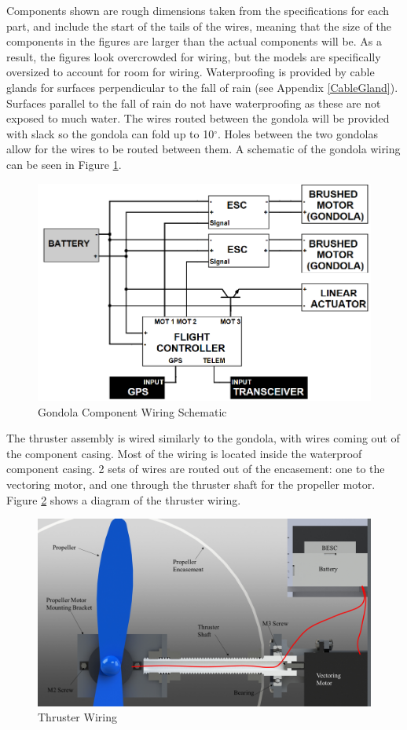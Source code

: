 \documentclass[../main.tex]{subfiles}
\begin{document}
Components shown are rough dimensions taken from the specifications for each part, and include the start of the tails of the wires, meaning that the size of the components in the figures are larger than the actual components will be. As a result, the figures look overcrowded for wiring, but the models are specifically oversized to account for room for wiring. Waterproofing is provided by cable glands for surfaces perpendicular to the fall of rain (see Appendix \ref{CableGland}). Surfaces parallel to the fall of rain do not have waterproofing as these are not exposed to much water. The wires routed between the gondola will be provided with slack so the gondola can fold up to 10$^{\circ}$. Holes between the two gondolas allow for the wires to be routed between them. A schematic of the gondola wiring can be seen in Figure \ref{fig:gondolaWiringSchematic}.

\begin{figure}[H]
	\centering
	\includegraphics[width=.8\linewidth]{img/design/gondola/gondolaWiringSchematic.png}
	\caption{Gondola Component Wiring Schematic}
	\label{fig:gondolaWiringSchematic}
\end{figure}

The thruster assembly is wired similarly to the gondola, with wires coming out of the component casing. Most of the wiring is located inside the waterproof component casing. 2 sets of wires are routed out of the encasement: one to the vectoring motor, and one through the thruster shaft for the propeller motor. Figure \ref{fig:thrusterWiring} shows a diagram of the thruster wiring.

\begin{figure}[H]
	\centering
	\includegraphics[width=.8\linewidth]{img/design/thruster/thrusterWiring.png}
	\caption{Thruster Wiring}
	\label{fig:thrusterWiring}
\end{figure}
\end{document}
